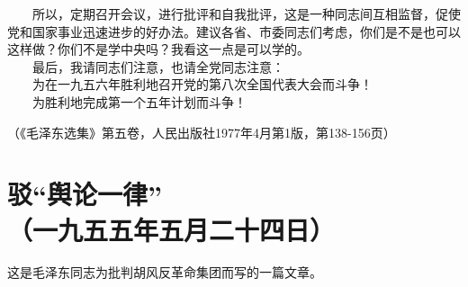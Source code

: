 \documentclass[cn,11pt,chinese]{elegantbook}
\def\myformat#1{\hfil\hfil #1}
\begin{document}
　　所以，定期召开会议，进行批评和自我批评，这是一种同志间互相监督，促使党和国家事业迅速进步的好办法。建议各省、市委同志们考虑，你们是不是也可以这样做？你们不是学中央吗？我看这一点是可以学的。\\
　　最后，我请同志们注意，也请全党同志注意：\\
　　为在一九五六年胜利地召开党的第八次全国代表大会而斗争！\\
　　为胜利地完成第一个五年计划而斗争！\\
\begin{flushright}（《毛泽东选集》第五卷，人民出版社1977年4月第1版，第138-156页）\end{flushright}
\newpage\section*{\myformat{驳“舆论一律”}\\\myformat{（一九五五年五月二十四日）}}
\begin{introduction}\item   这是毛泽东同志为批判胡风反革命集团而写的一篇文章。\end{introduction}
\end{document}
